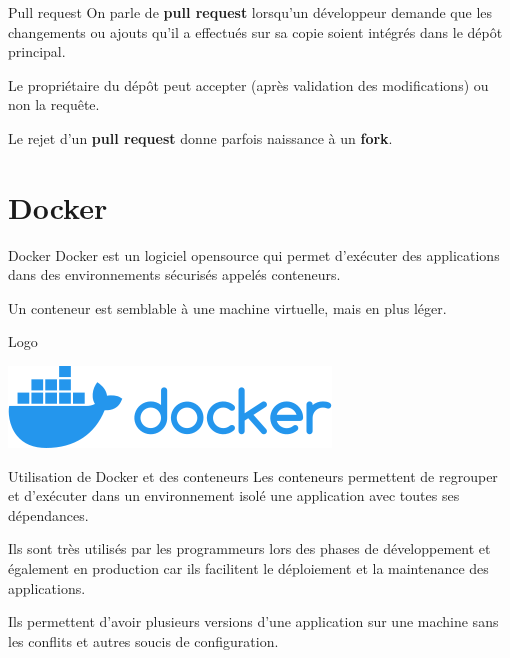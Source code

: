 \documentclass{beamer}
\begin{document}
\begin{frame}{Pull request}
  On parle de \textbf{pull request} lorsqu'un développeur demande que les changements ou ajouts qu'il a effectués sur sa copie soient intégrés dans le dépôt principal.

  Le propriétaire du dépôt peut accepter (après validation des modifications) ou non la requête.

  Le rejet d'un \textbf{pull request} donne parfois naissance à un \textbf{fork}.
\end{frame}

\section{Docker}

\begin{frame}{Docker}
  Docker est un logiciel opensource qui permet d'exécuter des applications dans des environnements sécurisés appelés conteneurs.

  Un conteneur est semblable à une machine virtuelle, mais en plus léger.
\end{frame}

\begin{frame}{Logo}
  \begin{center}
    \includegraphics[scale=0.5]{images/docker-logo.png}
  \end{center}
\end{frame}

\begin{frame}{Utilisation de Docker et des conteneurs}
Les conteneurs permettent de regrouper et d'exécuter dans un environnement isolé une application avec toutes ses dépendances.

Ils sont très utilisés par les programmeurs lors des phases de développement et également en production car ils facilitent le déploiement et la maintenance des applications.

Ils permettent d'avoir plusieurs versions d'une application sur une machine sans les conflits et autres soucis de configuration.
\end{frame}
\end{document}
